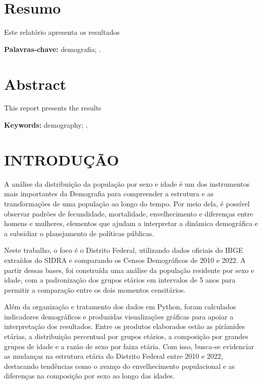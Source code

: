 \documentclass[a4paper,12pt]{article}
\begin{document}
	\clearpage
	
	\tableofcontents
	\clearpage
	
	\listoffigures
	\clearpage
	
	\listoftables
	\clearpage
	
	
	
	\section*{Resumo}
	Este relatório apresenta os resultados

	\textbf{Palavras-chave:} demografia; .


	\section*{Abstract}
	This report presents the results 

	\textbf{Keywords:} demography; .
	\newpage

\section{INTRODUÇÃO}

A análise da distribuição da população por sexo e idade é um dos instrumentos
mais importantes da Demografia para compreender a estrutura e as transformações
de uma população ao longo do tempo. Por meio dela, é possível observar padrões
de fecundidade, mortalidade, envelhecimento e diferenças entre homens e
mulheres, elementos que ajudam a interpretar a dinâmica demográfica e a
subsidiar o planejamento de políticas públicas.

Neste trabalho, o foco é o Distrito Federal, utilizando dados oficiais do IBGE
extraídos do SIDRA e comparando os Censos Demográficos de 2010 e 2022. A partir
dessas bases, foi construída uma análise da população residente por sexo e
idade, com a padronização dos grupos etários em intervalos de 5 anos para permitir a
comparação entre os dois momentos censitários.

Além da organização e tratamento dos dados em Python, foram calculados
indicadores demográficos e produzidas visualizações gráficas para apoiar a
interpretação dos resultados. Entre os produtos elaborados estão as pirâmides
etárias, a distribuição percentual por grupos etários, a composição por grandes
grupos de idade e a razão de sexo por faixa etária. Com isso, busca-se
evidenciar as mudanças na estrutura etária do Distrito Federal entre 2010 e
2022, destacando tendências como o avanço do envelhecimento populacional e as
diferenças na composição por sexo ao longo das idades.
\end{document}
